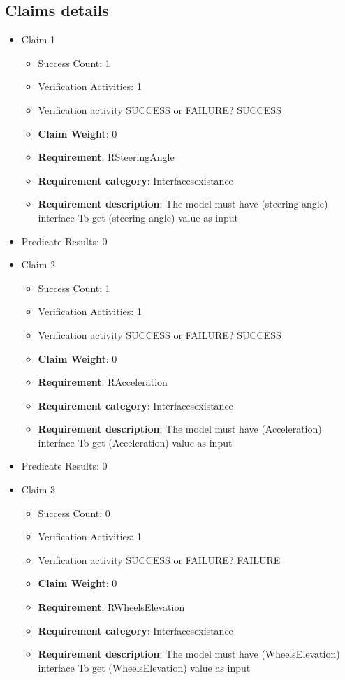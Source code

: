 \documentclass{article}
\begin{document}
			\subsection{Claims details}
			\begin{itemize}
  				  \item Claim 1
				\begin{itemize}
			    	\item Success Count: 1 
			    	\item Verification Activities: 1
					\item Verification activity SUCCESS or FAILURE? SUCCESS
					\item \textbf{Claim Weight}: 0
						\item \textbf{Requirement}: RSteeringAngle 
						\item \textbf{Requirement category}: Interfacesexistance 
						\item \textbf{Requirement description}: The model must have (steering angle) interface To get (steering angle) value as input
					
				\end{itemize}
				
									    
				\item Predicate Results: 0

  				  \item Claim 2
				\begin{itemize}
			    	\item Success Count: 1 
			    	\item Verification Activities: 1
					\item Verification activity SUCCESS or FAILURE? SUCCESS
					\item \textbf{Claim Weight}: 0
						\item \textbf{Requirement}: RAcceleration 
						\item \textbf{Requirement category}: Interfacesexistance 
						\item \textbf{Requirement description}: The model must have (Acceleration) interface To get (Acceleration) value as input
					
				\end{itemize}
				
									    
				\item Predicate Results: 0

  				  \item Claim 3
				\begin{itemize}
			    	\item Success Count: 0 
			    	\item Verification Activities: 1
					\item Verification activity SUCCESS or FAILURE? FAILURE
					\item \textbf{Claim Weight}: 0
						\item \textbf{Requirement}: RWheelsElevation 
						\item \textbf{Requirement category}: Interfacesexistance 
						\item \textbf{Requirement description}: The model must have (WheelsElevation) interface To get (WheelsElevation) value as input
					

\end{itemize}
\end{itemize}
\end{document}
